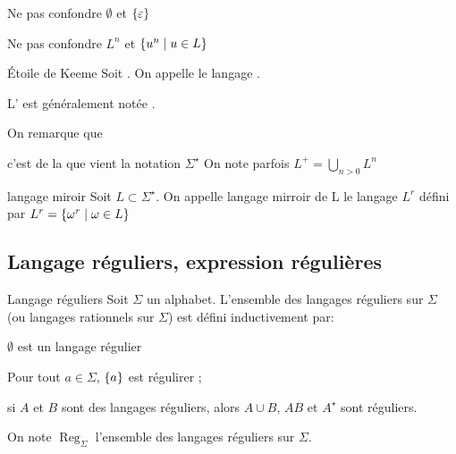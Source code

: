 \documentclass[a4paper,french,bookmarks]{book}
\DeclareMathOperator{\Reg}{Reg}
\begin{document}
    \begin{warning}{}{}
        \begin{enumerate}
            \itast Ne pas confondre $\emptyset$ et $\left\{\varepsilon\right\}$
            
            \itast Ne pas confondre $L^n$ et $\left\{u^n \;\middle\vert\; u \in L\right\}$
        \end{enumerate}
    \end{warning}
    
    \begin{definition}{Étoile de Keeme}{}
        Soit . On appelle  le langage .
    \end{definition}
    
    \begin{notation}
        L' est généralement notée .
    \end{notation}
    
    On remarque que
    \begin{enumerate}
        \itt c'est de la que vient la notation $\Sigma^\star$
        \itt On note parfois $L^+ = \bigcup_{n > 0} L^n$
    \end{enumerate}
    
    \begin{definition}{langage miroir}{}
        Soit $L \subset \Sigma^\star$. On appelle langage mirroir de L le langage $L^r$ défini par $L^r = \left\{\omega^r \;\middle\vert\; \omega \in L\right\}$
        
    \end{definition}
    
    \subsection{Langage réguliers, expression régulières}
    
    \begin{definition}{Langage réguliers}{} 
        Soit $\Sigma$ un alphabet. L'ensemble des langages réguliers sur $\Sigma$ (ou langages rationnels sur $\Sigma$) est défini inductivement par: 
        \begin{enumerate}
            \itast $\emptyset$ est un langage régulier
            
            \itast  Pour tout $a \in \Sigma$, $\left\{a\right\}$ est régulirer ;
            
            \itast si $A$ et $B$ sont des langages réguliers, alors $A \cup B$, $AB$ et $A^\star$ sont réguliers.
            
        \end{enumerate}
    \end{definition}
    \begin{notation}
        On note $\Reg_\Sigma$ l'ensemble des langages réguliers sur $\Sigma$.
    \end{notation}
    
\end{document}
